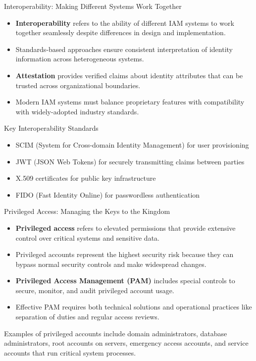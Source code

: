 \documentclass{beamer}
\begin{document}
\begin{frame}{Interoperability: Making Different Systems Work Together}
    \begin{itemize}
        \item \textbf{Interoperability} refers to the ability of different IAM systems to work together seamlessly despite differences in design and implementation.
        \item Standards-based approaches ensure consistent interpretation of identity information across heterogeneous systems.
        \item \textbf{Attestation} provides verified claims about identity attributes that can be trusted across organizational boundaries.
        \item Modern IAM systems must balance proprietary features with compatibility with widely-adopted industry standards.
    \end{itemize}
    
    \begin{block}{Key Interoperability Standards}
        \begin{itemize}
            \item SCIM (System for Cross-domain Identity Management) for user provisioning
            \item JWT (JSON Web Tokens) for securely transmitting claims between parties
            \item X.509 certificates for public key infrastructure
            \item FIDO (Fast Identity Online) for passwordless authentication
        \end{itemize}
    \end{block}
\end{frame}

\begin{frame}{Privileged Access: Managing the Keys to the Kingdom}
    \begin{itemize}
        \item \textbf{Privileged access} refers to elevated permissions that provide extensive control over critical systems and sensitive data.
        \item Privileged accounts represent the highest security risk because they can bypass normal security controls and make widespread changes.
        \item \textbf{Privileged Access Management (PAM)} includes special controls to secure, monitor, and audit privileged account usage.
        \item Effective PAM requires both technical solutions and operational practices like separation of duties and regular access reviews.
    \end{itemize}
    
    \begin{example}
        Examples of privileged accounts include domain administrators, database administrators, root accounts on servers, emergency access accounts, and service accounts that run critical system processes.
    \end{example}
\end{frame}
\end{document}

